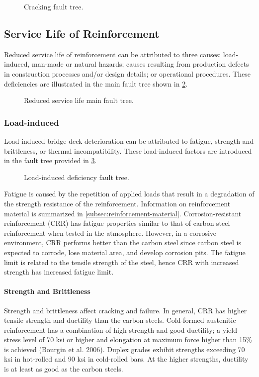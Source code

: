 \begin{figure}
  \caption{Cracking fault tree.}
  \label{fig:fault-tree-cracking} 
\end{figure}


\subsection{Service Life of Reinforcement}
Reduced service life of reinforcement can be attributed to three causes: load-induced, man-made or natural
hazards; causes resulting from production defects in construction processes and/or design details; or operational
procedures. These deficiencies are illustrated in the main fault tree shown in \cref{fig:fault-tree-reduced-main}.

\begin{figure}
  \caption{Reduced service life main fault tree.}
  \label{fig:fault-tree-reduced-main} 
\end{figure}

\subsubsection{Load-induced}
Load-induced bridge deck deterioration can be attributed to fatigue, strength and brittleness, or thermal
incompatibility. These load-induced factors are introduced in the fault tree provided in \cref{fig:fault-tree-load-induced}.

\begin{figure}
  \caption{Load-induced deficiency fault tree.}
  \label{fig:fault-tree-load-induced} 
\end{figure}

Fatigue is caused by the repetition of applied loads that result in a degradation of the strength resistance of the reinforcement. Information on reinforcement material is summarized in \cref{subsec:reinforcement-material}. Corrosion-resistant reinforcement (CRR) has fatigue properties similar to that of carbon steel reinforcement when tested in the atmosphere. However, in a corrosive environment, CRR performs better than the carbon steel since carbon steel is expected to corrode, lose material area, and develop corrosion pits. The fatigue limit is related to the tensile strength of the steel, hence CRR with increased strength has increased fatigue limit.

\paragraph{Strength and Brittleness}
Strength and brittleness affect cracking and failure. In general, CRR has higher tensile strength and ductility than
the carbon steels. Cold-formed austenitic reinforcement has a combination of high strength and good ductility; a yield
stress level of 70 ksi or higher and elongation at maximum force higher than 15\% is achieved (Bourgin et al. 2006).
Duplex grades exhibit strengths exceeding 70 ksi in hot-rolled and 90 ksi in cold-rolled bars. At the higher strengths,
ductility is at least as good as the carbon steels.

